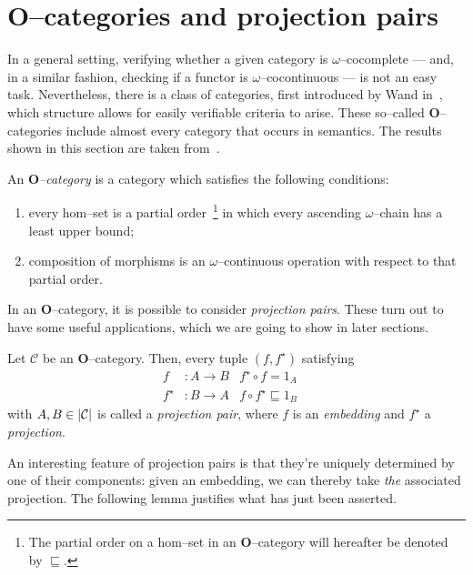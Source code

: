 \section{\(\mathbf{O}\)--categories and projection pairs}

In a general setting, verifying whether a given category is \(\omega\)--cocomplete --- and, in a similar fashion, checking if a functor is \(\omega\)--cocontinuous --- is not an easy task. %
Nevertheless, there is a class of categories, first introduced by Wand in~\cite{Wand1979}, which structure allows for easily verifiable criteria to arise.
These so--called \(\mathbf{O}\)--categories include almost every category that occurs in semantics.%
The results shown in this section are taken from~\cite{Smyth1982}.

\begin{dfn}
  An \emph{\(\mathbf{O}\)--category} is a category which satisfies the following conditions:
  \begin{enumerate}
    \item every hom--set is a partial order~\footnote{The partial order on a hom--set in an \(\mathbf{O}\)--category will hereafter be denoted by \(\sqsubseteq{}\).} in which every ascending %
    \(\omega\)--chain has a least upper bound; %
    \item composition of morphisms is an \(\omega\)--continuous operation with respect to that partial order. %
  \end{enumerate}
\end{dfn}

In an \(\mathbf{O}\)--category, it is possible to consider \emph{projection pairs}. These turn out to have some useful applications, which we are going to show in later sections.

\begin{dfn}
  Let \(\mathcal{C}\) be an \(\mathbf{O}\)--category. Then, every tuple \((f,f^\star)\) satisfying
  \begin{align}
    f &\colon A \to B & f^\star \circ f = 1_A \quad  \\
    f^\star &\colon B \to A & f \circ f^\star \sqsubseteq 1_B \quad
  \end{align}
  with \(A,B \in \lvert \mathcal{C} \rvert\) is called a \emph{projection pair}, where \(f\) is an \emph{embedding} and \(f^\star\) a \emph{projection}.%
\end{dfn}

An interesting feature of projection pairs is that they're uniquely determined by one of their components: given an embedding, we can thereby take \emph{the} associated projection.
The following lemma justifies what has just been asserted.

